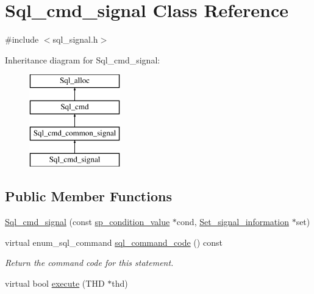 \hypertarget{classSql__cmd__signal}{}\section{Sql\+\_\+cmd\+\_\+signal Class Reference}
\label{classSql__cmd__signal}


{\ttfamily \#include $<$sql\+\_\+signal.\+h$>$}

Inheritance diagram for Sql\+\_\+cmd\+\_\+signal\+:\begin{figure}[H]
\begin{center}
\leavevmode
\includegraphics[height=4.000000cm]{classSql__cmd__signal}
\end{center}
\end{figure}
\subsection*{Public Member Functions}
\begin{DoxyCompactItemize}
\item 
\mbox{\hyperlink{classSql__cmd__signal_a89af0cc810f33f7203960346cc3a32d6}{Sql\+\_\+cmd\+\_\+signal}} (const \mbox{\hyperlink{classsp__condition__value}{sp\+\_\+condition\+\_\+value}} $\ast$cond, \mbox{\hyperlink{classSet__signal__information}{Set\+\_\+signal\+\_\+information}} $\ast$set)
\item 
\mbox{\label{classSql__cmd__signal_aec957b84824df02bc702b56af89c4caa}} 
virtual enum\+\_\+sql\+\_\+command \mbox{\hyperlink{classSql__cmd__signal_aec957b84824df02bc702b56af89c4caa}{sql\+\_\+command\+\_\+code}} () const
\begin{DoxyCompactList}\small\item\em Return the command code for this statement. \end{DoxyCompactList}\item 
virtual bool \mbox{\hyperlink{classSql__cmd__signal_a302864ac4023450ad3171525426eb1dc}{execute}} (T\+HD $\ast$thd)
\end{DoxyCompactItemize}
